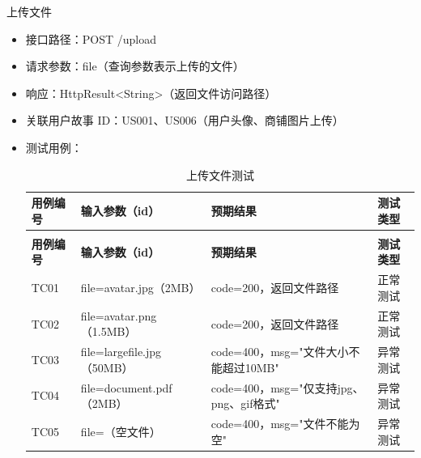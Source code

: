\begin{levellist}
\begin{levellist}
        \item 上传文件
        \begin{itemize}
            \item 接口路径：POST /upload
            \item 请求参数：file（查询参数表示上传的文件）
            \item 响应：HttpResult<String>（返回文件访问路径）
            \item 关联用户故事 ID：US001、US006（用户头像、商铺图片上传）
            \item 测试用例：
                  \begin{longtable}{>{\centering\arraybackslash}m{2cm} >{\centering\arraybackslash}m{4cm} >{\centering\arraybackslash}m{5cm} >{\centering\arraybackslash}m{2cm}}

                      \caption{上传文件测试} \label{tab:training}                                                      \\

                      \toprule
                      \textbf{用例编号} & \textbf{输入参数（id）}        & \textbf{预期结果}                   & \textbf{测试类型} \\
                      \midrule
                      \endfirsthead

                      \multicolumn{4}{c}{{\tablename\ \thetable{} 续表}}                                           \\
                      \toprule
                      \textbf{用例编号} & \textbf{输入参数（id）}        & \textbf{预期结果}                   & \textbf{测试类型} \\
                      \midrule
                      \endhead

                      \bottomrule
                      \endfoot

                      TC01          & file=avatar.jpg（2MB）     & code=200，返回文件路径                 & 正常测试          \\
                      TC02          & file=avatar.png（1.5MB）   & code=200，返回文件路径                 & 正常测试          \\
                      TC03          & file=largefile.jpg（50MB） & code=400，msg="文件大小不能超过10MB"     & 异常测试          \\
                      TC04          & file=document.pdf（2MB）   & code=400，msg="仅支持jpg、png、gif格式" & 异常测试          \\
                      TC05          & file=（空文件）               & code=400，msg="文件不能为空"           & 异常测试          \\
                  \end{longtable}
        \end{itemize}

    \end{levellist}

\end{levellist}

